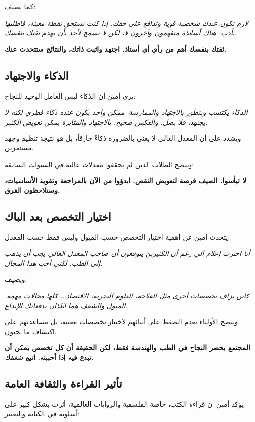 \documentclass[12pt,a4paper]{book}
\newcommand{\quoteAr}[1]{%
	\begin{myquote}
		\itshape #1
	\end{myquote}
}
\newcommand{\importantAr}[1]{%
	\begin{important}
		\bfseries #1
	\end{important}
}
\begin{document}
	كما يضيف: 
	\quoteAr{لازم تكون عندك شخصية قوية وتدافع على حقك. إذا كنت تستحق نقطة معينة، فاطلبها بأدب. هناك أساتذة متفهمون وآخرون لا، لكن لا تسمح لأحد بأن يهدم ثقتك بنفسك.}
	
	\importantAr{ثقتك بنفسك أهم من رأي أي أستاذ. اجتهد واثبت ذاتك، والنتائج ستتحدث عنك.}
	
	
	\subsection{الذكاء والاجتهاد}
	
	يرى أمين أن الذكاء ليس العامل الوحيد للنجاح:
	
	\quoteAr{الذكاء يكتسب ويتطور بالاجتهاد والممارسة. ممكن واحد يكون عنده ذكاء فطري لكنه لا يجتهد، فلا يصل. والعكس صحيح: بالاجتهاد والمثابرة يمكن تعويض الكثير.}
	
	ويشدد على أن المعدل العالي لا يعني بالضرورة ذكاءً خارقاً، بل هو نتيجة تنظيم وجهد مستمرين.
	
	وينصح الطلاب الذين لم يحققوا معدلات عالية في السنوات السابقة:
	
	\importantAr{لا تيأسوا. الصيف فرصة لتعويض النقص. ابدؤوا من الآن بالمراجعة وتقوية الأساسيات، وستلاحظون الفرق.}
	
	
	\subsection{اختيار التخصص بعد الباك}
	
	يتحدث أمين عن أهمية اختيار التخصص حسب الميول وليس فقط حسب المعدل:
	
	\quoteAr{أنا اخترت إعلام آلي رغم أن الكثيرين يتوقعون أن صاحب المعدل العالي يجب أن يذهب إلى الطب. لكني أحب هذا المجال.}
	
	ويضيف: \quoteAr{كاين بزاف تخصصات أخرى مثل الفلاحة، العلوم البحرية، الاقتصاد... كلها مجالات مهمة. الميول والشغف هما اللذان يدفعانك للإبداع.}
	
	وينصح الأولياء بعدم الضغط على أبنائهم لاختيار تخصصات معينة، بل مساعدتهم على اكتشاف ما يحبون.
	
	\importantAr{المجتمع يحصر النجاح في الطب والهندسة فقط، لكن الحقيقة أن كل تخصص يمكن أن تبدع فيه إذا أحببته. اتبع شغفك.}
	
	
	\subsection{تأثير القراءة والثقافة العامة}
	
	يؤكد أمين أن قراءة الكتب، خاصة الفلسفية والروايات العالمية، أثرت بشكل كبير على أسلوبه في الكتابة والتعبير:
	
\end{document}
